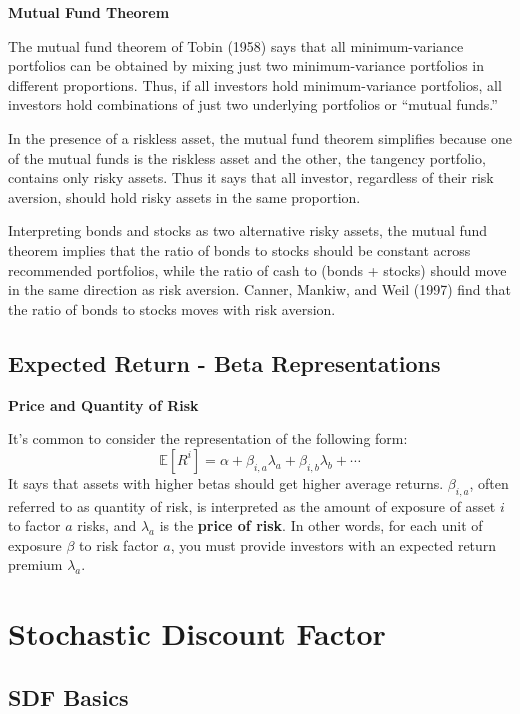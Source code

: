 \documentclass[
]{book}
\begin{document}
\textbf{Mutual Fund Theorem}

The mutual fund theorem of Tobin (1958) says that all minimum-variance portfolios can be obtained by mixing just two minimum-variance portfolios in different proportions. Thus, if all investors hold minimum-variance portfolios, all investors hold combinations of just two underlying portfolios or ``mutual funds.''

In the presence of a riskless asset, the mutual fund theorem simplifies because one of the mutual funds is the riskless asset and the other, the tangency portfolio, contains only risky assets. Thus it says that all investor, regardless of their risk aversion, should hold risky assets in the same proportion.

Interpreting bonds and stocks as two alternative risky assets, the mutual fund theorem implies that the ratio of bonds to stocks should be constant across recommended portfolios, while the ratio of cash to (bonds + stocks) should move in the same direction as risk aversion. Canner, Mankiw, and Weil (1997) find that the ratio of bonds to stocks moves with risk aversion.

\hypertarget{expected-return---beta-representations}{%
\section{Expected Return - Beta Representations}\label{expected-return---beta-representations}}

\textbf{Price and Quantity of Risk}

It's common to consider the representation of the following form:
\[
\mathbb{E}[R^i] = \alpha + \beta_{i,a}\lambda_a + \beta_{i,b}\lambda_b +\cdots
\]
It says that assets with higher betas should get higher average returns. \(\beta_{i,a}\), often referred to as quantity of risk, is interpreted as the amount of exposure of asset \(i\) to factor \(a\) risks, and \(\lambda_a\) is the \textbf{price of risk}. In other words, for each unit of exposure \(\beta\) to risk factor \(a\), you must provide investors with an expected return premium \(\lambda_a\).

\hypertarget{stochastic-discount-factor}{%
\chapter{Stochastic Discount Factor}\label{stochastic-discount-factor}}

\hypertarget{sdf-basics}{%
\section{SDF Basics}\label{sdf-basics}}
\end{document}
